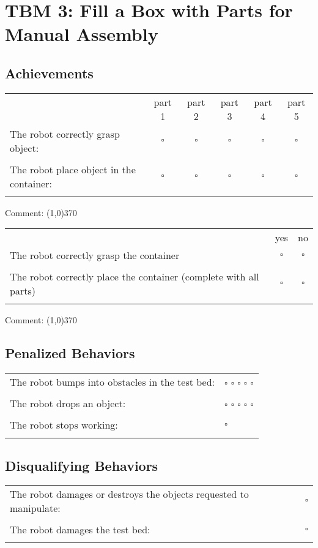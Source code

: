 \section*{TBM 3: Fill a Box with Parts for Manual Assembly}


\subsection*{Achievements}
\begin{tabular}{ l c c c c c}
 & part 1 & part 2 & part 3 & part 4 & part 5 \\ 
The robot correctly grasp object: & $\square$ & $\square$ & $\square$ & $\square$ & $\square$\\ \\
The robot place object in the container: & $\square$ & $\square$ & $\square$ & $\square$ & $\square$\\ \\
\end{tabular}

\vspace{0.2cm}
Comment: \line(1,0){370}
\vspace{0.6cm}

\noindent
\begin{tabular}{ l c c}
 & yes & no \\ 
The robot correctly grasp the container & $\square$ & $\square$ \\ \\
The robot correctly place the container (complete with all parts) & $\square$ & $\square$ \\ \\
\end{tabular}

\vspace{0.2cm}
Comment: \line(1,0){370}

\subsection*{Penalized Behaviors}
\begin{tabular}{ l l}
The robot bumps into obstacles in the test bed: & $\square$ $\square$ $\square$ $\square$ $\square$ \\ \\
The robot drops an object: & $\square$ $\square$ $\square$ $\square$ $\square$ \\ \\
The robot stops working: & $\square$ \\ \\


\end{tabular}

\subsection*{Disqualifying Behaviors}
\begin{tabular}{ l c}
The robot damages or destroys the objects requested to manipulate: & $\square$ \\ \\
The robot damages the test bed: & $\square$ \\ \\
\end{tabular}


